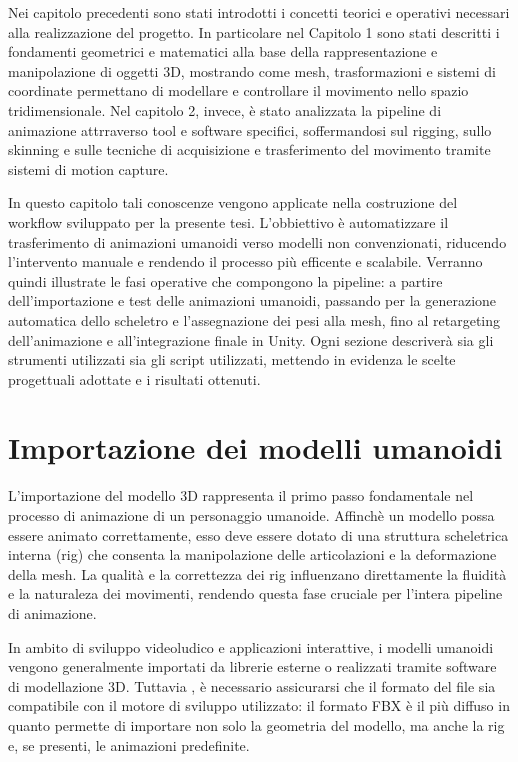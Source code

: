 Nei capitolo precedenti sono stati introdotti i concetti teorici e operativi necessari alla realizzazione del progetto. In particolare nel Capitolo 1 sono stati descritti i fondamenti geometrici e matematici alla base della rappresentazione e manipolazione di oggetti 3D, mostrando come mesh, trasformazioni e sistemi di coordinate permettano di modellare e controllare il movimento nello spazio tridimensionale. Nel capitolo 2, invece, è stato analizzata la pipeline di animazione attrraverso tool e software specifici, soffermandosi sul rigging, sullo skinning e sulle tecniche di acquisizione e trasferimento del movimento tramite sistemi di motion capture.

In questo capitolo tali conoscenze vengono applicate nella costruzione del workflow sviluppato per la presente tesi. L'obbiettivo è automatizzare il trasferimento di animazioni umanoidi verso modelli non convenzionati, riducendo l'intervento manuale e rendendo il processo più efficente e scalabile. Verranno quindi illustrate le fasi operative che compongono la pipeline: a partire dell'importazione e test delle animazioni umanoidi, passando per la generazione automatica dello scheletro e l'assegnazione dei pesi alla mesh, fino al retargeting dell'animazione e all'integrazione finale in Unity. Ogni sezione descriverà sia gli strumenti utilizzati sia gli script utilizzati, mettendo in evidenza le scelte progettuali adottate e i risultati ottenuti.

\section{Importazione dei modelli umanoidi}

L'importazione del modello 3D rappresenta il primo passo fondamentale nel processo di animazione di un personaggio umanoide. Affinchè un modello possa essere animato correttamente, esso deve essere dotato di una struttura scheletrica interna (rig) che consenta la manipolazione delle articolazioni e la deformazione della mesh. La qualità e la correttezza dei rig influenzano direttamente la fluidità e la naturaleza dei movimenti, rendendo questa fase cruciale per l'intera pipeline di animazione.

In ambito di sviluppo videoludico e applicazioni interattive, i modelli umanoidi vengono generalmente importati da librerie esterne o realizzati tramite software di modellazione 3D. Tuttavia , è necessario assicurarsi che il formato del file sia compatibile con il motore di sviluppo utilizzato: il formato FBX è il più diffuso in quanto permette di importare non solo la geometria del modello, ma anche la rig e, se presenti, le animazioni predefinite.

